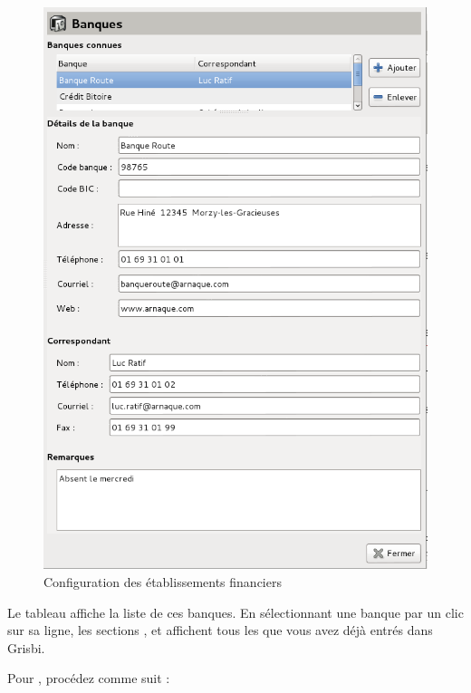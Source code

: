 \ifIllustration
\begin{figure}[ht!]
\begin{center}
\includegraphics[scale=0.48]{image/screenshot/setup_bank}
\end{center}
\caption{Configuration des établissements financiers}
\label{setup-bank-img}
\end{figure}
\fi

Le tableau  affiche la liste de ces banques. En sélectionnant une banque par un clic sur sa ligne, les sections ,  et  affichent tous les  que vous avez déjà entrés dans Grisbi.

Pour , procédez comme suit :

